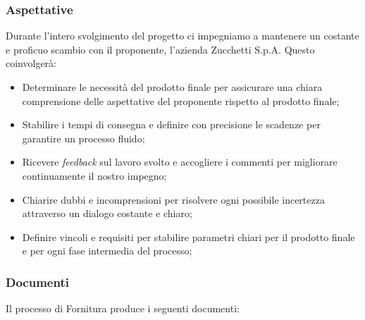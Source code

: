 \documentclass[5pt]{article}
\begin{document}
\subsubsection{Aspettative }

Durante l'intero svolgimento del progetto ci impegniamo a mantenere un costante e proficuo scambio con il proponente, l'azienda Zucchetti S.p.A. Questo coinvolgerà:
\begin{itemize}
    \item Determinare le necessità del prodotto finale per assicurare una chiara comprensione delle aspettative del proponente rispetto al prodotto finale;
    \item Stabilire i tempi di consegna e definire con precisione le scadenze per garantire un processo fluido;
    \item Ricevere \textit{feedback} sul lavoro svolto e accogliere i commenti per migliorare continuamente il nostro impegno;
    \item Chiarire dubbi e incomprensioni per risolvere ogni possibile incertezza attraverso un dialogo costante e chiaro;
    \item Definire vincoli e requisiti per stabilire parametri chiari per il prodotto finale e per ogni fase intermedia del processo;
\end{itemize}

\subsubsection{Documenti}
Il processo di Fornitura produce i seguenti documenti:
\end{document}
